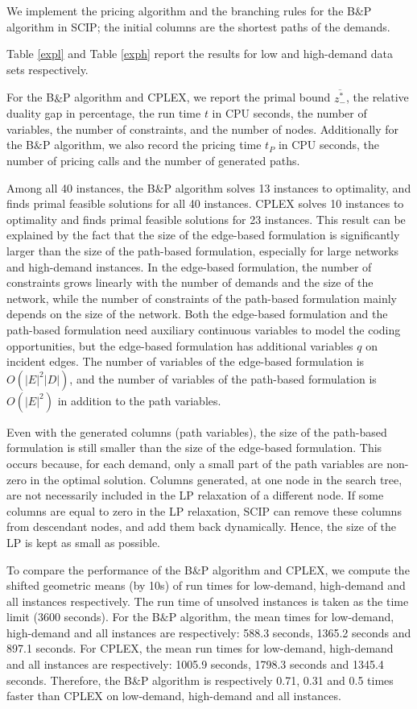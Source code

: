  We implement the pricing algorithm and the branching rules for the B\(\&\)P algorithm in SCIP; the initial columns are the shortest paths of the demands.
 
 Table \eqref{expl} and Table \eqref{exph} report the results for low and high-demand data sets respectively.
 
 For the B\(\&\)P algorithm and CPLEX,
 we report the primal bound \(\overline{z^*_{-}}\), the relative duality gap in percentage, the run time \(t\) in CPU seconds, the number of variables, the number of constraints, and the number of nodes. Additionally for the B\(\&\)P algorithm, we also record the pricing time \(t_P\) in  CPU seconds, the number of pricing calls and the number of generated paths.

Among all 40 instances, the B\(\&\)P algorithm solves 13 instances to optimality, and finds primal feasible solutions for all 40 instances. CPLEX solves 10 instances to optimality and finds primal feasible solutions for 23 instances.  This result can be explained by the fact that the size of the edge-based formulation is significantly larger than the size of the path-based formulation, especially for large networks and high-demand instances.
In the edge-based formulation, the number of constraints grows linearly with the number of demands and the size of the network, while the number of constraints of the path-based formulation mainly depends on the size of the network. Both the edge-based formulation and the path-based formulation need auxiliary continuous variables to model the coding opportunities, but the edge-based formulation has additional variables \(q\) on incident edges. The number of variables of the edge-based formulation is \(O(|E|^2|D|)\), and the number of variables of the path-based formulation is \(O(|E|^2)\) in addition to the path variables.

 Even with the generated columns (path variables), the size of the path-based formulation is still smaller than the size of the edge-based formulation. This occurs because, for each demand, only a small part of the path variables are non-zero in the optimal solution. Columns generated, at one node in the search tree, are not necessarily included in the LP relaxation of a different node. If some columns are equal to zero in the LP relaxation, SCIP can remove these columns from descendant nodes, and add them back dynamically. Hence, the size of the LP is kept as small as possible.

To compare the performance of the B\(\&\)P algorithm and CPLEX, we compute the shifted geometric means (by 10s) of run times for low-demand, high-demand and all instances respectively.
The run time of unsolved instances is taken as the time limit (3600 seconds).
For the B\(\&\)P algorithm, the mean times for low-demand, high-demand and all instances are respectively: 588.3 seconds, 1365.2 seconds and 897.1 seconds.  
For CPLEX, the mean run times for low-demand, high-demand and all instances are respectively: 1005.9 seconds, 1798.3 seconds and 1345.4 seconds.
Therefore, the B\(\&\)P algorithm is respectively 0.71, 0.31 and 0.5 times faster than  CPLEX on low-demand, high-demand and all instances.


